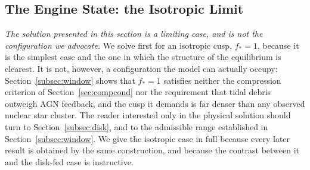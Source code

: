 \documentclass[preprint2]{aastex}
\begin{document}
\subsection{The Engine State: the Isotropic Limit}\label{subsec:engine-state}

{\it The solution presented in this section is a limiting case, and is not the configuration we advocate.} We solve first for an isotropic cusp, $f_{\ast} = 1$, because it is the simplest case and the one in which the structure of the equilibrium is clearest. It is not, however, a configuration the model can actually occupy: Section~\ref{subsec:window} shows that $f_{\ast} = 1$ satisfies neither the compression criterion of Section~\ref{sec:compcond} nor the requirement that tidal debris outweigh AGN feedback, and the cusp it demands is far denser than any observed nuclear star cluster. The reader interested only in the physical solution should turn to Section~\ref{subsec:disk}, and to the admissible range established in Section~\ref{subsec:window}. We give the isotropic case in full because every later result is obtained by the same construction, and because the contrast between it and the disk-fed case is instructive.
\end{document}
